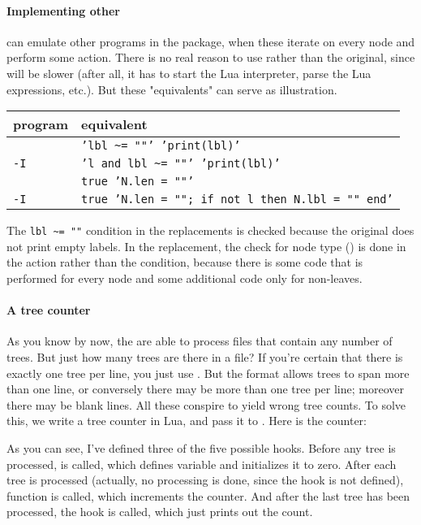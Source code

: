 \paragraph{Implementing other \nutils}

\luaed{} can emulate other programs in the package, when these
iterate on every node and perform some action. There is no real reason to use
\luaed{} rather than the original, since \luaed{} will be slower (after all, it
has to start the Lua interpreter, parse the Lua expressions, etc.). But these
"equivalents" can serve as illustration.

\startalignment[center]
\begin{tabular}{ll}
program & \luaed{} equivalent \\
\hline
{}{} 						& {\tt 'lbl \~{}= ""' 'print(lbl)'}  \\
{} {\tt -I} 		& {\tt 'l and lbl \~{}= ""' 'print(lbl)'} \\
\topology{}						& {\tt true 'N.len = ""'} \\
\topology{} {\tt -I} 	& {\tt true 'N.len = ""; if not l then N.lbl = "" end'}
\end{tabular}
\stopalignment

The {\tt lbl \~{}= ""} condition in the  replacements is checked
because the original  does not print empty labels. In the \topology{}
replacement, the check for node type () is done in the action rather
than the condition, because there is some code that is performed for every node
and some additional code only for non-leaves. 

\paragraph{A tree counter}

As you know by now, the \nutils{} are able to process files that contain any
number of trees. But just how many trees are there in a file? If you're certain
that there is exactly one tree per line, you just use . But the
\nw{} format allows trees to span more than one line, or conversely there may be
more than one tree per line; moreover there may be blank lines. All these
conspire to yield wrong tree counts. To solve this, we write a tree counter in
Lua, and pass it to \luaed. Here is the counter:

\page[no]


As you can see, I've defined three of the five possible hooks. Before any tree
is processed,  is called, which defines variable
 and initializes it to zero. After each tree is processed
(actually, no processing is done, since the  hook is not defined),
function  is called, which increments the counter. And after
the last tree has been processed, the  hook is called, which
just prints out the count.

